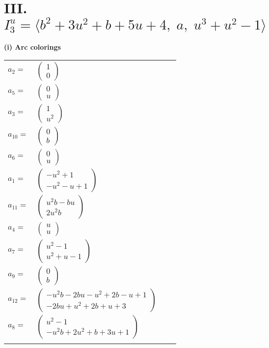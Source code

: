 \documentclass[1p]{elsarticle_modified}
\theoremstyle{definition}
\begin{document}
\centering \section*{III. $I^u_{3}= \langle b^2+3 u^2+b+5 u+4,\;a,\;u^3+u^2-1 \rangle$}
\flushleft \textbf{(i) Arc colorings}\\
\begin{tabular}{m{7pt} m{180pt} m{7pt} m{180pt} }
\flushright $a_{2}=$&$\begin{pmatrix}1\\0\end{pmatrix}$ \\
\flushright $a_{5}=$&$\begin{pmatrix}0\\u\end{pmatrix}$ \\
\flushright $a_{3}=$&$\begin{pmatrix}1\\u^2\end{pmatrix}$ \\
\flushright $a_{10}=$&$\begin{pmatrix}0\\b\end{pmatrix}$ \\
\flushright $a_{6}=$&$\begin{pmatrix}0\\u\end{pmatrix}$ \\
\flushright $a_{1}=$&$\begin{pmatrix}- u^2+1\\- u^2- u+1\end{pmatrix}$ \\
\flushright $a_{11}=$&$\begin{pmatrix}u^2 b- b u\\2 u^2 b\end{pmatrix}$ \\
\flushright $a_{4}=$&$\begin{pmatrix}u\\u\end{pmatrix}$ \\
\flushright $a_{7}=$&$\begin{pmatrix}u^2-1\\u^2+u-1\end{pmatrix}$ \\
\flushright $a_{9}=$&$\begin{pmatrix}0\\b\end{pmatrix}$ \\
\flushright $a_{12}=$&$\begin{pmatrix}- u^2 b-2 b u- u^2+2 b- u+1\\-2 b u+u^2+2 b+u+3\end{pmatrix}$ \\
\flushright $a_{8}=$&$\begin{pmatrix}u^2-1\\- u^2 b+2 u^2+b+3 u+1\end{pmatrix}$\\&\end{tabular}
\end{document}

